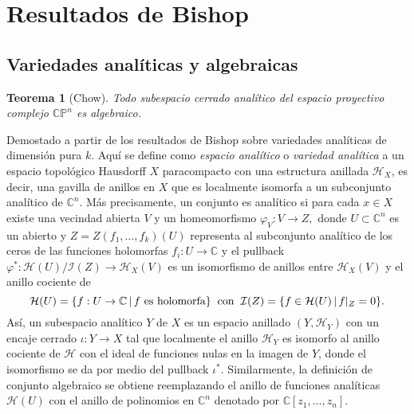 \documentclass{article}
\newtheorem{teorema}{Teorema}[section]
\newcommand{\co}{\ensuremath{\mathbb C }}
\newcommand{\con}{\ensuremath{\mathbb{C}^n}}
\newcommand{\cp}{\ensuremath{\mathbb{CP}}}
\begin{document}
\section{Resultados de Bishop}
\subsection{Variedades anal\'iticas y algebraicas}
\begin{teorema}[Chow]\label{Chow}
        Todo subespacio cerrado anal\'itico del espacio proyectivo complejo $\cp^{n}$ es algebraico.
\end{teorema}
\noindent Demostado a partir de los resultados de Bishop sobre variedades anal\'iticas de dimensi\'on pura $k$. Aqu\'i se define como \emph{espacio 
anal\'itico} o \emph{variedad anal\'itica} a un espacio topol\'ogico Hausdorff $X$ paracompacto con una estructura anillada $\mathcal{H}_X$, es decir, una 
gavilla de anillos en $X$ que es localmente isomorfa a un subconjunto anal\'itico de $\con$. M\'as precisamente, un conjunto es anal\'itico 
si para cada $x\in X$ existe una vecindad abierta $V$ y un homeomorfismo $\varphi_V:V\rightarrow Z,$ donde $U\subset\con$ es un abierto y $Z=Z(f_1,\dots,f_k)(U)$ 
representa al subconjunto anal\'itico de los ceros de las funciones holomorfas $f_i:U\rightarrow\co$ y el pullback $\varphi^{*}:\mathcal{H}(U)/\mathcal{I}(Z)\rightarrow \mathcal{H}_X(V)$ 
es un isomorfismo de anillos entre $\mathcal{H}_X(V)$ y el anillo cociente de
\[
        \mathcal{H}(U)=\{f:U\rightarrow\co\,|\,f \text{ es holomorfa}\}\hspace{0.2cm}\text{con}\hspace{0.2cm}\mathcal{I}(Z)=\{f\in\mathcal{H}(U)\,|\,f|_{Z}=0\}.
\]
As\'i, un subespacio anal\'itico $Y$ de $X$ es un espacio anillado $(Y,\mathcal{H}_Y)$ con un encaje cerrado $\iota:Y\rightarrow X$ tal que localmente el anillo
$\mathcal{H}_Y$ es isomorfo al anillo cociente de $\mathcal{H}$ con el ideal de funciones nulas en la imagen de $Y$, donde el isomorfismo se da por medio del 
pullback $\iota^{*}$. Similarmente, la definici\'on de conjunto algebraico se obtiene reemplazando el anillo de funciones anal\'iticas $\mathcal{H}(U)$ con el anillo de 
polinomios en $\con$ denotado por $\co[z_1,\dots,z_n]$.
\end{document}
